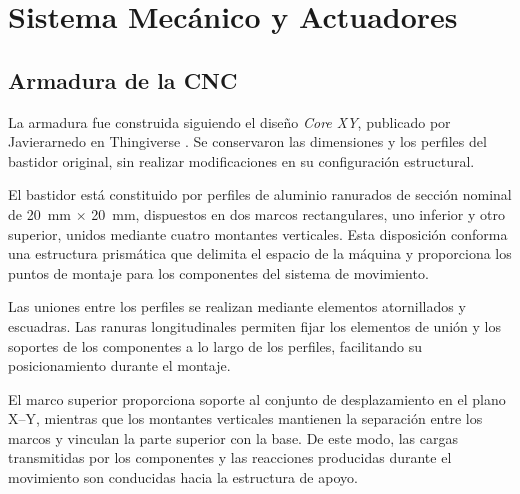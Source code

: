 \documentclass[blue,fullpaper]{ludusofficial}  %
\begin{document}

\section{Sistema Mecánico y Actuadores}

\subsection{Armadura de la CNC}

La armadura fue construida siguiendo el diseño
\textit{Core XY}, publicado por Javierarnedo en
Thingiverse \cite{estructura_thingiverse}. Se conservaron
las dimensiones y los perfiles del bastidor original,
sin realizar modificaciones en su configuración
estructural.

El bastidor está constituido por perfiles de aluminio
ranurados de sección nominal de 20~mm $\times$ 20~mm,
dispuestos en dos marcos rectangulares, uno inferior
y otro superior, unidos mediante cuatro montantes
verticales. Esta disposición conforma una estructura
prismática que delimita el espacio de la máquina y
proporciona los puntos de montaje para los componentes
del sistema de movimiento.

Las uniones entre los perfiles se realizan mediante
elementos atornillados y escuadras. Las ranuras
longitudinales permiten fijar los elementos de unión
y los soportes de los componentes a lo largo de los
perfiles, facilitando su posicionamiento durante
el montaje.

El marco superior proporciona soporte al conjunto
de desplazamiento en el plano X--Y, mientras que
los montantes verticales mantienen la separación
entre los marcos y vinculan la parte superior
con la base. De este modo, las cargas transmitidas
por los componentes y las reacciones producidas
durante el movimiento son conducidas hacia
la estructura de apoyo.
\end{document}
